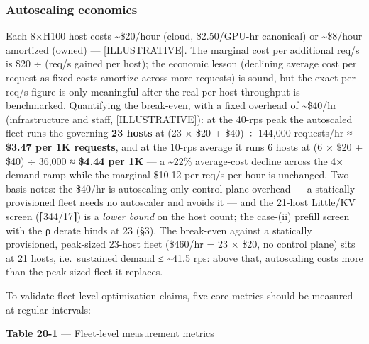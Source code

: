\subsubsection{Autoscaling economics}\label{autoscaling-economics}

Each 8×H100 host costs \textasciitilde\$20/hour (cloud, \$2.50/GPU-hr
canonical) or \textasciitilde\$8/hour amortized (owned) ---
\mbox{{[}ILLUSTRATIVE{]}}. The marginal cost per additional req/s is \$20 ÷
(req/s gained per host); the economic lesson (declining average cost per
request as fixed costs amortize across more requests) is sound, but the
exact per-req/s figure is only meaningful after the real per-host
throughput is benchmarked. Quantifying the break-even, with a fixed
overhead of \textasciitilde\$40/hr (infrastructure and staff,
\mbox{{[}ILLUSTRATIVE{]}}): at the 40-rps peak the autoscaled fleet runs the
governing \textbf{23 hosts} at (23 × \$20 + \$40) ÷ 144,000 requests/hr
≈ \textbf{\$3.47 per 1K requests}, and at the 10-rps average it runs 6
hosts at (6 × \$20 + \$40) ÷ 36,000 ≈ \textbf{\$4.44 per 1K} --- a
\textasciitilde22\% average-cost decline across the 4× demand ramp while
the marginal \$10.12 per req/s per hour is unchanged. Two basis notes:
the \$40/hr is autoscaling-only control-plane overhead --- a statically
provisioned fleet needs no autoscaler and avoids it --- and the 21-host
Little/KV screen (⌈344/17⌉) is a \emph{lower bound} on the host count;
the case-(ii) prefill screen with the ρ derate binds at 23 (§3). The
break-even against a statically provisioned, peak-sized 23-host fleet
(\$460/hr = 23 × \$20, no control plane) sits at 21 hosts,
i.e.~sustained demand ≤ \textasciitilde41.5 rps: above that, autoscaling
costs more than the peak-sized fleet it replaces.


\label{measurement}


To validate fleet-level optimization claims, five core metrics should be
measured at regular intervals:


\textbf{\hyperref[tab:20.1]{Table 20-1}} --- Fleet-level measurement metrics


